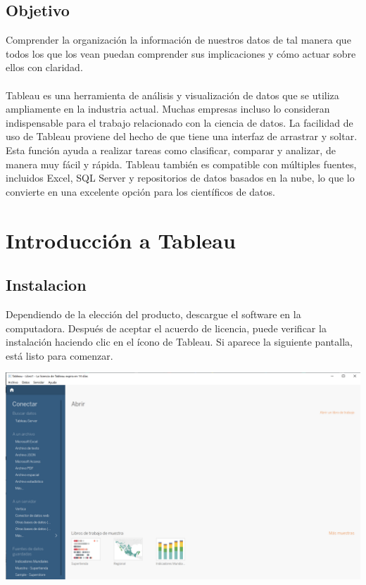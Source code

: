\documentclass[12pt,letterpaper]{article}
\begin{document}
\subsection*{Objetivo} 
Comprender la organización la información de nuestros datos de tal manera que todos los que los vean 
puedan comprender sus implicaciones y cómo actuar sobre ellos con claridad.
\\\\Tableau es una herramienta de análisis y visualización de datos que se utiliza ampliamente en la
industria actual. Muchas empresas incluso lo consideran indispensable para el trabajo relacionado con
la ciencia de datos. La facilidad de uso de Tableau proviene del hecho de que tiene una interfaz de
arrastrar y soltar. Esta función ayuda a realizar tareas como clasificar, comparar y analizar, de manera
muy fácil y rápida. Tableau también es compatible con múltiples fuentes, incluidos Excel, SQL Server
y repositorios de datos basados en la nube, lo que lo convierte en una excelente opción para los
científicos de datos.

\section{Introducción a Tableau}
\subsection{Instalacion} 
Dependiendo de la elección del producto, descargue el software en la computadora. Después de aceptar
el acuerdo de licencia, puede verificar la instalación haciendo clic en el ícono de Tableau. Si aparece la
siguiente pantalla, está listo para comenzar.
\begin{center}
    \includegraphics[width=16cm]{img/1.png}  
\end{center}
\end{document}
